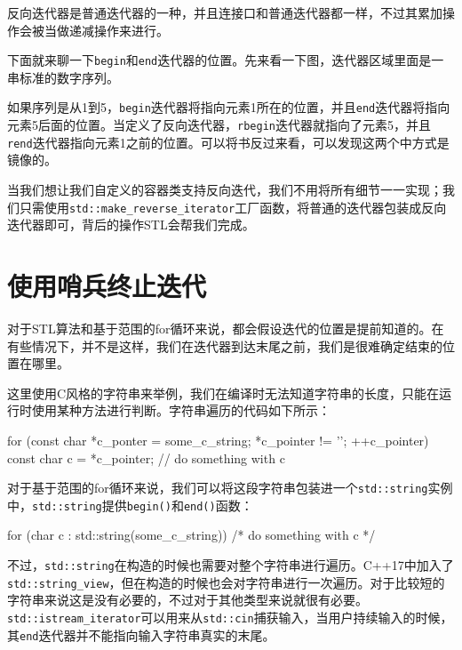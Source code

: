 反向迭代器是普通迭代器的一种，并且连接口和普通迭代器都一样，不过其累加操作会被当做递减操作来进行。

下面就来聊一下\texttt{begin}和\texttt{end}迭代器的位置。先来看一下图，迭代器区域里面是一串标准的数字序列。


如果序列是从1到5，\texttt{begin}迭代器将指向元素1所在的位置，并且\texttt{end}迭代器将指向元素5后面的位置。当定义了反向迭代器，\texttt{rbegin}迭代器就指向了元素5，并且\texttt{rend}迭代器指向元素1之前的位置。可以将书反过来看，可以发现这两个中方式是镜像的。

当我们想让我们自定义的容器类支持反向迭代，我们不用将所有细节一一实现；我们只需使用\texttt{std::make\_reverse\_iterator}工厂函数，将普通的迭代器包装成反向迭代器即可，背后的操作STL会帮我们完成。


\section{使用哨兵终止迭代}

对于STL算法和基于范围的for循环来说，都会假设迭代的位置是提前知道的。在有些情况下，并不是这样，我们在迭代器到达末尾之前，我们是很难确定结束的位置在哪里。

这里使用C风格的字符串来举例，我们在编译时无法知道字符串的长度，只能在运行时使用某种方法进行判断。字符串遍历的代码如下所示：

\begin{codebox}[cpp]
for (const char *c_ponter = some_c_string; *c_pointer != '\0'; ++c_pointer) {
    const char c = *c_pointer;
    // do something with c
}
\end{codebox}

对于基于范围的for循环来说，我们可以将这段字符串包装进一个\texttt{std::string}实例中，\texttt{std::string}提供\texttt{begin()}和\texttt{end()}函数：

\begin{codebox}[cpp]
for (char c : std::string(some_c_string)) { /* do something with c */ }
\end{codebox}

不过，\texttt{std::string}在构造的时候也需要对整个字符串进行遍历。C++17中加入了\texttt{std::string\_view}，但在构造的时候也会对字符串进行一次遍历。对于比较短的字符串来说这是没有必要的，不过对于其他类型来说就很有必要。\texttt{std::istream\_iterator}可以用来从\texttt{std::cin}捕获输入，当用户持续输入的时候，其\texttt{end}迭代器并不能指向输入字符串真实的末尾。

